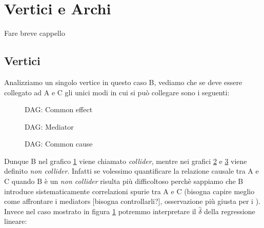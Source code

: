 


\section{Vertici e Archi}
Fare breve cappello

\subsection{Vertici}
Analizziamo un singolo vertice in questo caso B, vediamo che se deve essere collegato ad A e C gli unici modi in cui si può collegare sono i seguenti: 
\begin{figure}[H]
\centering    
\caption{DAG: Common effect}
\label{DAG:Common effect}
\end{figure} 
\begin{figure}[H]
	\centering
\caption{DAG: Mediator}
\label{DAG:Mediator}
\end{figure} 
\begin{figure}[H]
	\centering
\caption{DAG: Common cause}
\label{DAG:Common cause}
\end{figure}
Dunque B nel grafico \ref{DAG:Common effect} viene chiamato \textit{collider}, mentre nei grafici \ref{DAG:Mediator} e \ref{DAG:Common cause} viene definito \textit{non collider}.
Infatti se volessimo quantificare la relazione causale tra A e C quando B è un \textit{non collider} risulta più difficoltoso perchè sappiamo che B introduce  sistematicamente correlazioni spurie tra A e C (bisogna capire meglio come affrontare i mediators [bisogna controllarli?], osservazione più giusta per i ). Invece nel caso mostrato in figura \ref{DAG:Common effect} potremmo interpretare il $\hat{\delta}$ della regressione lineare:
